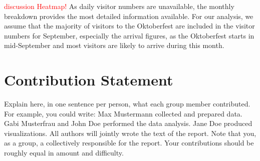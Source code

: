 \documentclass{article}
\theoremstyle{plain}
\theoremstyle{definition}
\theoremstyle{remark}
\begin{document}
\textcolor{red}{discussion Heatmap!}
As daily visitor numbers are unavailable, the monthly breakdown provides the most detailed information available. For our analysis, we assume that the majority of visitors to the Oktoberfest are included in the visitor numbers for September, especially the arrival figures, as the Oktoberfest starts in mid-September and most visitors are likely to arrive during this month.

\section*{Contribution Statement}

Explain here, in one sentence per person, what each group member contributed. For example, you could write: Max Mustermann collected and prepared data. Gabi Musterfrau and John Doe performed the data analysis. Jane Doe produced visualizations. All authors will jointly wrote the text of the report. Note that you, as a group, a collectively responsible for the report. Your contributions should be roughly equal in amount and difficulty.




\end{document}
